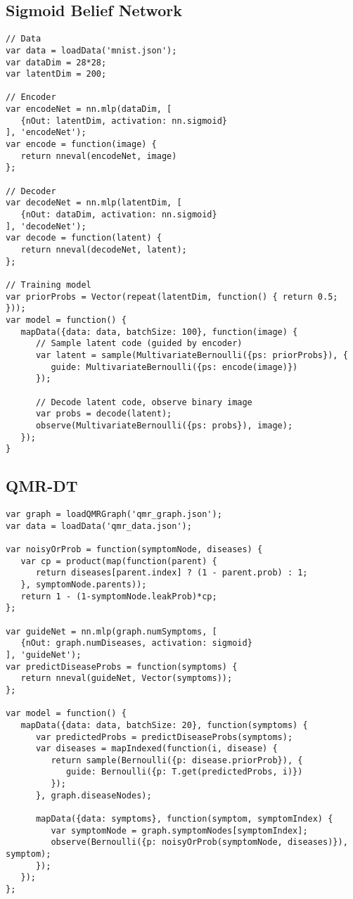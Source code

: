 \subsection{Sigmoid Belief Network}
\label{sec:appendix_code:sbn}

\begin{lstlisting}
// Data
var data = loadData('mnist.json');
var dataDim = 28*28;
var latentDim = 200;

// Encoder
var encodeNet = nn.mlp(dataDim, [
   {nOut: latentDim, activation: nn.sigmoid}
], 'encodeNet');
var encode = function(image) {
   return nneval(encodeNet, image)
};

// Decoder
var decodeNet = nn.mlp(latentDim, [
   {nOut: dataDim, activation: nn.sigmoid}
], 'decodeNet');
var decode = function(latent) {
   return nneval(decodeNet, latent);
};

// Training model
var priorProbs = Vector(repeat(latentDim, function() { return 0.5; }));
var model = function() {
   mapData({data: data, batchSize: 100}, function(image) {
      // Sample latent code (guided by encoder)
      var latent = sample(MultivariateBernoulli({ps: priorProbs}), {
         guide: MultivariateBernoulli({ps: encode(image)})
      });

      // Decode latent code, observe binary image
      var probs = decode(latent);
      observe(MultivariateBernoulli({ps: probs}), image);
   });
}
\end{lstlisting}

\subsection{QMR-DT}
\label{sec:appendix_code:qmr}

\begin{lstlisting}
var graph = loadQMRGraph('qmr_graph.json');
var data = loadData('qmr_data.json');

var noisyOrProb = function(symptomNode, diseases) {
   var cp = product(map(function(parent) {
      return diseases[parent.index] ? (1 - parent.prob) : 1;
   }, symptomNode.parents));
   return 1 - (1-symptomNode.leakProb)*cp;
};

var guideNet = nn.mlp(graph.numSymptoms, [
   {nOut: graph.numDiseases, activation: sigmoid}
], 'guideNet');
var predictDiseaseProbs = function(symptoms) {
   return nneval(guideNet, Vector(symptoms));
};

var model = function() {
   mapData({data: data, batchSize: 20}, function(symptoms) {
      var predictedProbs = predictDiseaseProbs(symptoms);
      var diseases = mapIndexed(function(i, disease) {
         return sample(Bernoulli({p: disease.priorProb}), {
            guide: Bernoulli({p: T.get(predictedProbs, i)})
         });
      }, graph.diseaseNodes);

      mapData({data: symptoms}, function(symptom, symptomIndex) {
         var symptomNode = graph.symptomNodes[symptomIndex];
         observe(Bernoulli({p: noisyOrProb(symptomNode, diseases)}), symptom);
      });
   });
};
\end{lstlisting}


